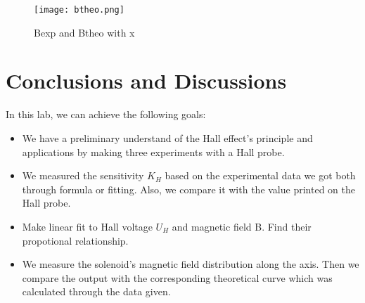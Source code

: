 \documentclass[12pt,a4paper]{article}
\begin{document}
\begin{figure}[H]
    \centering
    \texttt{[image: btheo.png]}
    \caption{Bexp and Btheo with x}
    \label{btheo}
\end{figure}

\section{Conclusions and Discussions}

In this lab, we can achieve the following goals:
\begin{itemize}
    \item We have a preliminary understand of the Hall effect's principle and applications by making three experiments with a Hall probe.
    \item We measured the sensitivity $K_H$ based on the experimental data we got both through formula or fitting. Also, we compare it with the value printed on the Hall probe.
    \item Make linear fit to Hall voltage $U_H$ and magnetic field B. Find their propotional relationship.
	\item We measure the solenoid's magnetic field distribution along the axis. Then we compare the output with the corresponding theoretical curve which was calculated through the data given.
\end{itemize}
\end{document}
